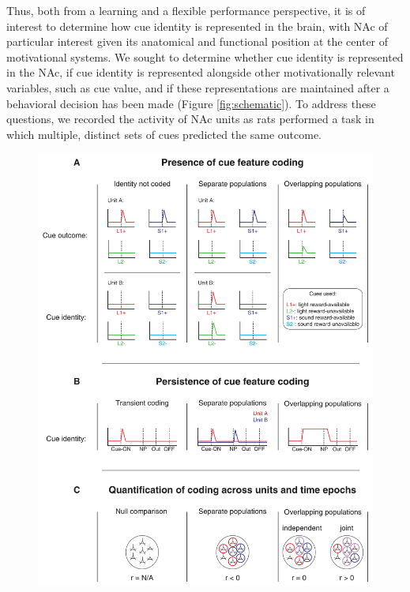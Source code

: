 \documentclass[11pt]{article}
\begin{document}
Thus, both from a learning and a flexible performance perspective, it
is of interest to determine how cue identity is represented in the
brain, with NAc of particular interest given its anatomical and
functional position at the center of motivational systems. We sought
to determine whether cue identity is represented in the NAc, if cue
identity is represented alongside other motivationally relevant
variables, such as cue value, and if these representations are
maintained after a behavioral decision has been made (Figure
\ref{fig:schematic}). To address these questions, we recorded the
activity of NAc units as rats performed a task in which multiple,
distinct sets of cues predicted the same outcome.


 \begin{figure}[ht!]
\centering
\includegraphics[height=0.7\textheight]{Fig 1 - Schematic neural.pdf}

\end{figure}
\end{document}
